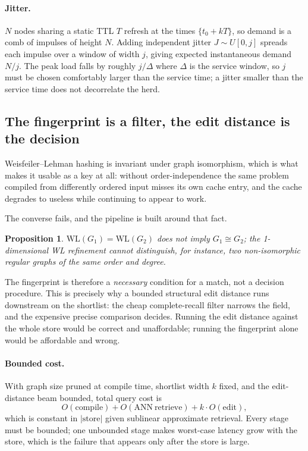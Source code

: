 \documentclass[11pt]{article}
\newtheorem{prop}{Proposition}[section]
\begin{document}
\paragraph{Jitter.} $N$ nodes sharing a static TTL $T$ refresh at the times
$\{t_0 + kT\}$, so demand is a comb of impulses of height $N$. Adding
independent jitter $J \sim U[0, j]$ spreads each impulse over a window of width
$j$, giving expected instantaneous demand $N/j$. The peak load falls by roughly
$j/\Delta$ where $\Delta$ is the service window, so $j$ must be chosen
comfortably larger than the service time; a jitter smaller than the service
time does not decorrelate the herd.

\subsection{The fingerprint is a filter, the edit distance is the decision}
\label{lbl:HS-IDENT-03}

Weisfeiler--Lehman hashing is invariant under graph isomorphism, which is what
makes it usable as a key at all: without order-independence the same problem
compiled from differently ordered input misses its own cache entry, and the
cache degrades to useless while continuing to appear to work.

The converse fails, and the pipeline is built around that fact.

\begin{prop}
$\mathrm{WL}(G_1) = \mathrm{WL}(G_2)$ does not imply $G_1 \cong G_2$; the
1-dimensional WL refinement cannot distinguish, for instance, two
non-isomorphic regular graphs of the same order and degree.
\end{prop}

The fingerprint is therefore a \emph{necessary} condition for a match, not a
decision procedure. This is precisely why a bounded structural edit distance
runs downstream on the shortlist: the cheap complete-recall filter narrows the
field, and the expensive precise comparison decides. Running the edit distance
against the whole store would be correct and unaffordable; running the
fingerprint alone would be affordable and wrong.

\paragraph{Bounded cost.} With graph size pruned at compile time, shortlist
width $k$ fixed, and the edit-distance beam bounded, total query cost is
\begin{equation}
O(\mathrm{compile}) + O(\mathrm{ANN\ retrieve}) + k \cdot O(\mathrm{edit}),
\end{equation}
which is constant in $|\mathrm{store}|$ given sublinear approximate retrieval.
Every stage must be bounded; one unbounded stage makes worst-case latency grow
with the store, which is the failure that appears only after the store is large.
\end{document}
